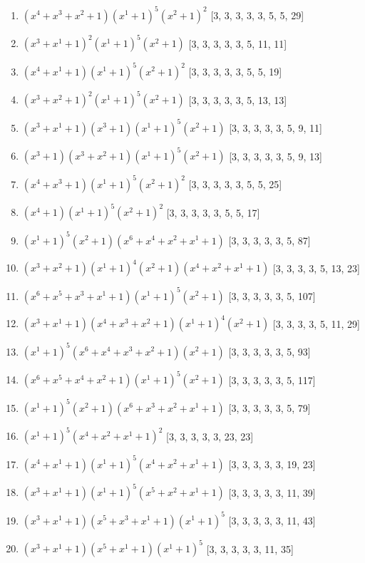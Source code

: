 \documentclass[10pt,twocolumn]{article}
\begin{document}
\begin{enumerate}
\item $(x^{4} + x^{3} + x^{2} + 1)(x^{1} + 1)^{5}(x^{2} + 1)^{2}$  [3, 3, 3, 3, 3, 5, 5, 29]
\item $(x^{3} + x^{1} + 1)^{2}(x^{1} + 1)^{5}(x^{2} + 1)$  [3, 3, 3, 3, 3, 5, 11, 11]
\item $(x^{4} + x^{1} + 1)(x^{1} + 1)^{5}(x^{2} + 1)^{2}$  [3, 3, 3, 3, 3, 5, 5, 19]
\item $(x^{3} + x^{2} + 1)^{2}(x^{1} + 1)^{5}(x^{2} + 1)$  [3, 3, 3, 3, 3, 5, 13, 13]
\item $(x^{3} + x^{1} + 1)(x^{3} + 1)(x^{1} + 1)^{5}(x^{2} + 1)$  [3, 3, 3, 3, 3, 5, 9, 11]
\item $(x^{3} + 1)(x^{3} + x^{2} + 1)(x^{1} + 1)^{5}(x^{2} + 1)$  [3, 3, 3, 3, 3, 5, 9, 13]
\item $(x^{4} + x^{3} + 1)(x^{1} + 1)^{5}(x^{2} + 1)^{2}$  [3, 3, 3, 3, 3, 5, 5, 25]
\item $(x^{4} + 1)(x^{1} + 1)^{5}(x^{2} + 1)^{2}$  [3, 3, 3, 3, 3, 5, 5, 17]
\item $(x^{1} + 1)^{5}(x^{2} + 1)(x^{6} + x^{4} + x^{2} + x^{1} + 1)$  [3, 3, 3, 3, 3, 5, 87]
\item $(x^{3} + x^{2} + 1)(x^{1} + 1)^{4}(x^{2} + 1)(x^{4} + x^{2} + x^{1} + 1)$  [3, 3, 3, 3, 5, 13, 23]
\item $(x^{6} + x^{5} + x^{3} + x^{1} + 1)(x^{1} + 1)^{5}(x^{2} + 1)$  [3, 3, 3, 3, 3, 5, 107]
\item $(x^{3} + x^{1} + 1)(x^{4} + x^{3} + x^{2} + 1)(x^{1} + 1)^{4}(x^{2} + 1)$  [3, 3, 3, 3, 5, 11, 29]
\item $(x^{1} + 1)^{5}(x^{6} + x^{4} + x^{3} + x^{2} + 1)(x^{2} + 1)$  [3, 3, 3, 3, 3, 5, 93]
\item $(x^{6} + x^{5} + x^{4} + x^{2} + 1)(x^{1} + 1)^{5}(x^{2} + 1)$  [3, 3, 3, 3, 3, 5, 117]
\item $(x^{1} + 1)^{5}(x^{2} + 1)(x^{6} + x^{3} + x^{2} + x^{1} + 1)$  [3, 3, 3, 3, 3, 5, 79]
\item $(x^{1} + 1)^{5}(x^{4} + x^{2} + x^{1} + 1)^{2}$  [3, 3, 3, 3, 3, 23, 23]
\item $(x^{4} + x^{1} + 1)(x^{1} + 1)^{5}(x^{4} + x^{2} + x^{1} + 1)$  [3, 3, 3, 3, 3, 19, 23]
\item $(x^{3} + x^{1} + 1)(x^{1} + 1)^{5}(x^{5} + x^{2} + x^{1} + 1)$  [3, 3, 3, 3, 3, 11, 39]
\item $(x^{3} + x^{1} + 1)(x^{5} + x^{3} + x^{1} + 1)(x^{1} + 1)^{5}$  [3, 3, 3, 3, 3, 11, 43]
\item $(x^{3} + x^{1} + 1)(x^{5} + x^{1} + 1)(x^{1} + 1)^{5}$  [3, 3, 3, 3, 3, 11, 35]

\end{enumerate}
\end{document}
